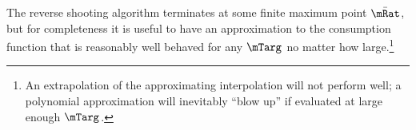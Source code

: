 \documentclass{\handout}
\begin{document}
\begin{CDCPrivate}
\begin{comment}
Similarly, we can recursively obtain 
\begin{equation}\begin{gathered}\begin{aligned}
  -\cPP_{\barwedge} & =  \chi_{1}-\chi_{0}/\mRat
\\ \chi_{1} & =  \chi_{0}/\mRat - \cPP_{\barwedge}
\\  -\cP_{\barwedge} & =  \chi_{2}+\chi_{1}\mRat -\chi_{0} \log \mRat
\\ \chi_{2} & =  \chi_{0} \log \mRat - \cP_{\barwedge} - \chi_{1} \mRat
\\  -\cons_{\barwedge} & =  \chi_{3} + \chi_{2} \mRat + (1/2) \chi_{1} \mRat^{2} - \chi_{0} (- \mRat + \mRat \log \mRat)
\\  \chi_{3} & =  \chi_{0} (- \mRat + \mRat \log \mRat)-\chi_{2} \mRat - (1/2) \chi_{1} \mRat^{2} -\cons_{\barwedge}
\end{aligned}\end{gathered}\end{equation}
so that the limiting approximation to the consumption function is 
\begin{equation}\begin{gathered}\begin{aligned}
  \label{eq:cFuncLimInfty}
   \cFunc(\mRat) & =  -\left(\chi_{3} + \chi_{2} \mRat + (1/2) \chi_{1} \mRat^{2} - \chi_{0} (- \mRat + \mRat \log \mRat)  \right)
\end{aligned}\end{gathered}\end{equation}

\centerline{\Large New Consumption Function Approximation}
\end{comment}

\end{CDCPrivate} 

The reverse shooting algorithm terminates at some finite maximum point $\bar\mRat$, but for completeness 
it is useful to have an approximation to the consumption function that is reasonably well behaved
for any $\mTarg^{\null}$ no matter how large.\footnote{An extrapolation of the approximating interpolation will 
not perform well; a polynomial approximation will inevitably ``blow up'' if evaluated at large enough $\mTarg^{\null}$.}
\end{document}
